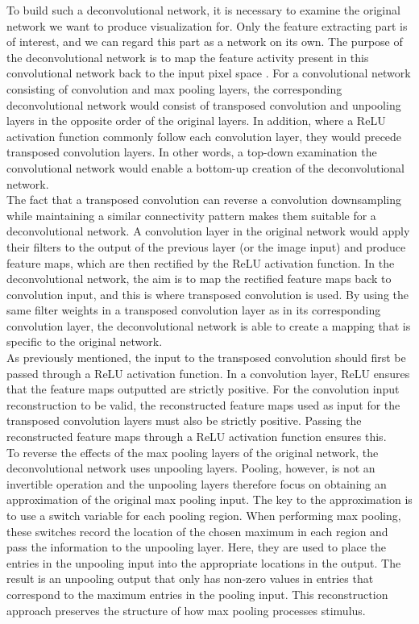 \noindent To build such a deconvolutional network, it is necessary to examine the original network we want to produce visualization for. Only the feature extracting part is of interest, and we can regard this part as a network on its own. The purpose of the deconvolutional network is to map the feature activity present in this convolutional network back to the input pixel space \cite{deconv_vis}. For a convolutional network consisting of convolution and max pooling layers, the corresponding deconvolutional network would consist of transposed convolution and unpooling layers in the opposite order of the original layers. In addition, where a ReLU activation function commonly follow each convolution layer, they would precede transposed convolution layers. In other words, a top-down examination the convolutional network would enable a bottom-up creation of the deconvolutional network. \\

\noindent The fact that a transposed convolution can reverse a convolution downsampling while maintaining a similar connectivity pattern makes them suitable for a deconvolutional network. A convolution layer in the original network would apply their filters to the output of the previous layer (or the image input) and produce feature maps, which are then rectified by the ReLU activation function. In the deconvolutional network, the aim is to map the rectified feature maps back to convolution input, and this is where transposed convolution is used. By using the same filter weights in a transposed convolution layer as in its corresponding convolution layer, the deconvolutional network is able to create a mapping that is specific to the original network. \\

\noindent As previously mentioned, the input to the transposed convolution should first be passed through a ReLU activation function. In a convolution layer, ReLU ensures that the feature maps outputted are strictly positive. For the convolution input reconstruction to be valid, the reconstructed feature maps used as input for the transposed convolution layers must also be strictly positive. Passing the reconstructed feature maps through a ReLU activation function ensures this. \\

\noindent To reverse the effects of the max pooling layers of the original network, the deconvolutional network uses unpooling layers. Pooling, however, is not an invertible operation and the unpooling layers therefore focus on obtaining an approximation of the original max pooling input. The key to the approximation is to use a switch variable for each pooling region. When performing max pooling, these switches record the location of the chosen maximum in each region and pass the information to the unpooling layer. Here, they are used to place the entries in the unpooling input into the appropriate locations in the output. The result is an unpooling output that only has non-zero values in entries that correspond to the maximum entries in the pooling input. This reconstruction approach preserves the structure of how max pooling processes stimulus. \\

